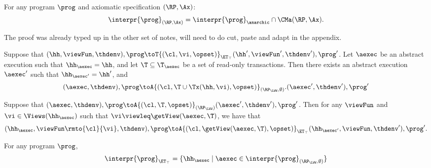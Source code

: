 \begin{theorem}
For any program $\prog$ and axiomatic specification $(\RP, \Ax)$:
\[
\interpr{\prog}_{(\RP, \Ax)} = \interpr{\prog}_{\anarchic} \cap \CMa(\RP, \Ax). 
\]
\end{theorem}
\ac{The proof was already typed up in the other set of notes, will need to do 
cut, paste and adapt in the appendix.}



\begin{proposition}
\label{prop:kv2aexec_transition}
Suppose that $(\hh, \viewFun, \thdenv), \prog \toT{(\cl, \vi, \opset)}_{\ET_{\top}} (\hh', 
\viewFun', \thdenv'), \prog'$. Let $\aexec$ be an abstract execution 
such that $\hh_{\aexec} = \hh$, and let $\T \subseteq \T_{\aexec}$ be a 
set of read-only transactions. Then there exists an abstract execution $\aexec'$ 
such that $\hh_{\aexec'} = \hh'$, and 
\[
(\aexec, \thdenv), \prog \toA{(\cl, \T \cup \Tx(\hh, \vi), \opset)}_{(\RP_{\LWW}, \emptyset)}. 
(\aexec', \thdenv'), \prog'
\]
\end{proposition}

\begin{proposition}
\label{prop:aexec2kv_transition}
Suppose that $(\aexec, \thdenv), \prog \toA{(\cl, \T, \opset)}_{(\RP_{\LWW})} (\aexec', \thdenv'), \prog'$. 
Then for any $\viewFun$ and $\vi \in \Views(\hh_{\aexec})$ such that $\vi \viewleq \getView(\aexec, \T)$, 
we have that 
\[
(\hh_{\aexec}, \viewFun\rmto{\cl}{\vi}, \thdenv), \prog \toA{(\cl, \getView(\aexec, \T), \opset)}_{\ET_{\top}} (\hh_{\aexec'}, \viewFun, \thdenv'), \prog'.
\]
\end{proposition}

\begin{corollary}
For any program $\prog$, 
\[
\interpr{\prog}_{\ET_{\top}} = \{\hh_{\aexec} \mid \aexec \in \interpr{\prog}_{(\RP_{\LWW}, \emptyset)}\}
\]
\end{corollary}

